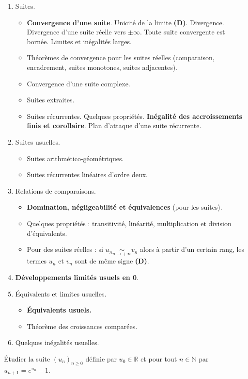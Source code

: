 \documentclass[twoside,a4paper,french,10pt]{VcCours}
\begin{document}
\begin{enumerate}
\item Suites.
\begin{itemize}
\item \textbf{Convergence d'une suite}. Unicité de la limite \textbf{(D)}. Divergence. Divergence d'une suite réelle vers $\pm \infty$. Toute suite convergente est bornée. Limites et inégalités larges. 
\item Théorèmes de convergence pour les suites réelles (comparaison, encadrement, suites monotones, suites adjacentes).
\item Convergence d'une suite complexe.
\item Suites extraites.
\item Suites récurrentes. Quelques propriétés. \textbf{Inégalité des accroissements finis et corollaire}. Plan d'attaque d'une suite récurrente.
\end{itemize}
\item Suites usuelles.
\begin{itemize}
\item Suites arithmético-géométriques.
\item Suites récurrentes linéaires d'ordre deux.
\end{itemize} 
\item Relations de comparaisons.
\begin{itemize}
\item \textbf{Domination, négligeabilité et équivalences} (pour les suites).
\item Quelques propriétés : transitivité, linéarité, multiplication et division d'équivalents.
\item Pour des suites réelles : si $u_n  \underset{n \rightarrow + \infty}{\sim} v_n $ alors à partir d'un certain rang, les termes $u_n$ et $v_n$ sont de même signe \textbf{(D)}.
\end{itemize}
\item\textbf{Développements limités usuels en 0}.
\item Équivalents et limites usuelles.
\begin{itemize}
\item \textbf{Équivalents usuels.}
\item Théorème des croissances comparées.
\end{itemize}
\item Quelques inégalités usuelles.
\end{enumerate}


\begin{Exercice}{}
  Étudier la suite $(u_n)_{n \geq 0}$ définie par $u_0 \in \mathbb{R}$ et pour tout $n \in \mathbb{N}$ par $u_{n+1}=e^{u_n}-1$.
\end{Exercice}
\end{document}
